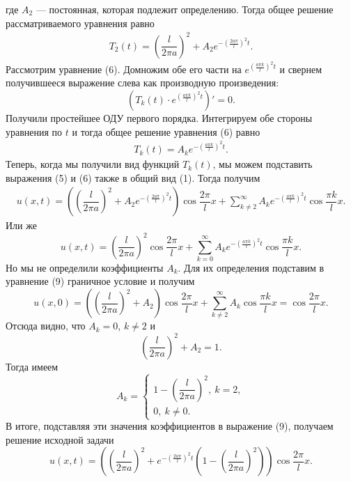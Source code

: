 \documentclass[a4paper, 12pt]{report}
\begin{document}
	где $A_2$ --- постоянная, которая подлежит определению.
	Тогда общее решение рассматриваемого уравнения равно 
	\begin{eqnarray}
		T_2(t) = \left(\dfrac{l}{2\pi a}\right)^2 + A_2e^{-\left(\frac{2a\pi}{l}\right)^2t} .
	\end{eqnarray}
	Рассмотрим уравнение (6). Домножим обе его части на $e^{\left(\frac{a\pi k}{l}\right)^2t}$ и свернем получившееся выражение слева как производную произведения:
	$$\left(T_k(t)\cdot e^{\left(\frac{a\pi k}{l}\right)^2t}\right)' =0.$$
	Получили простейшее ОДУ первого порядка. Интегрируем обе стороны уравнения по $t$ и тогда общее решение уравнения (6) равно 
	\begin{eqnarray}
		T_k(t) = A_ke^{-\left(\frac{a\pi k}{l}\right)^2t}.
	\end{eqnarray}
	Теперь, когда мы получили вид функций $T_k(t)$, мы можем подставить выражения (5) и (6) также в общий вид (1). Тогда получим
	\begin{eqnarray}
		u(x,t) = \left(\left(\dfrac{l}{2\pi a}\right)^2 + A_2e^{-\left(\frac{2a\pi}{l}\right)^2t}\right)\cos\dfrac{2\pi}{l}x + \sum_{k\ne 2}^\infty A_ke^{-\left(\frac{a\pi k}{l}\right)^2t}\cos\dfrac{\pi k}{l}x.
	\end{eqnarray}
	Или же 
	$$u(x,t) = \left(\dfrac{l}{2\pi a}\right)^2\cos\dfrac{2\pi}{l}x + \sum_{k=0}^\infty A_ke^{-\left(\frac{a\pi k}{l}\right)^2t}\cos\dfrac{\pi k}{l}x.$$
	Но мы не определили коэффициенты $A_k$. Для их определения подставим в уравнение (9) граничное условие и получим
	$$u(x,0) = \left(\left(\dfrac{l}{2\pi a}\right)^2 + A_2\right)\cos\dfrac{2\pi}{l}x + \sum_{k\ne 2}^\infty A_k\cos\dfrac{\pi k}{l}x = \cos\dfrac{2\pi }{l} x.$$
	Отсюда видно, что $A_k = 0$, $k \ne 2$ и $$\left(\dfrac{l}{2\pi a}\right)^2 + A_2 = 1.$$
	Тогда имеем $$A_k = \begin{cases}
		1 - \left(\dfrac{l}{2\pi a}\right)^2, \ k = 2,\\
		0,\ k \ne 0.
	\end{cases}$$
	В итоге, подставляя эти значения коэффициентов в выражение (9), получаем решение исходной задачи $$u(x,t) = \left(\left(\dfrac{l}{2\pi a}\right)^2 + e^{-\left(\frac{2a\pi}{l}\right)^2t}\left(1 - \left(\dfrac{l}{2\pi a}\right)^2\right) \right)\cos\dfrac{2\pi}{l}x.$$
\end{document}
